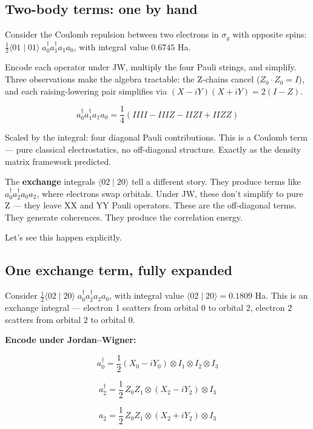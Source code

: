 \documentclass[
  11pt,
  oneside]{book}
\begin{document}
\subsection{Two-body terms: one by
hand}\label{two-body-terms-one-by-hand}

Consider the Coulomb repulsion between two electrons in \(\sigma_g\)
with opposite spins:
\(\frac{1}{2}\langle 01 \mid 01\rangle\; a_0^\dagger a_1^\dagger a_1 a_0\),
with integral value \(0.6745\) Ha.

Encode each operator under JW, multiply the four Pauli strings, and
simplify. Three observations make the algebra tractable: the Z-chains
cancel (\(Z_0 \cdot Z_0 = I\)), and each raising-lowering pair
simplifies via \((X - iY)(X + iY) = 2(I - Z)\).

\[a_0^\dagger a_1^\dagger a_1 a_0 = \frac{1}{4}(IIII - IIIZ - IIZI + IIZZ)\]

Scaled by the integral: four diagonal Pauli contributions. This is a
Coulomb term --- pure classical electrostatics, no off-diagonal
structure. Exactly as the density matrix framework predicted.

The \textbf{exchange} integrals \(\langle 02 \mid 20\rangle\) tell a
different story. They produce terms like
\(a_0^\dagger a_2^\dagger a_0 a_2\), where electrons swap orbitals.
Under JW, these don't simplify to pure Z --- they leave XX and YY Pauli
operators. These are the off-diagonal terms. They generate coherences.
They produce the correlation energy.

Let's see this happen explicitly.

\subsection{One exchange term, fully
expanded}\label{one-exchange-term-fully-expanded}

Consider
\(\frac{1}{2}\langle 02 \mid 20\rangle\; a_0^\dagger a_2^\dagger a_2 a_0\),
with integral value \(\langle 02 \mid 20\rangle = 0.1809\) Ha. This is
an exchange integral --- electron 1 scatters from orbital 0 to orbital
2, electron 2 scatters from orbital 2 to orbital 0.

\textbf{Encode under Jordan--Wigner:}

\[a_0^\dagger = \frac{1}{2}(X_0 - iY_0) \otimes I_1 \otimes I_2 \otimes I_3\]

\[a_2^\dagger = \frac{1}{2}\,Z_0 Z_1 \otimes (X_2 - iY_2) \otimes I_3\]

\[a_2 = \frac{1}{2}\,Z_0 Z_1 \otimes (X_2 + iY_2) \otimes I_3\]
\end{document}
